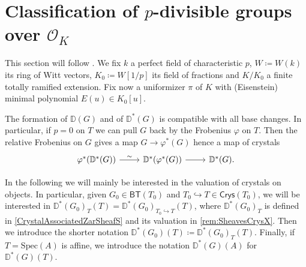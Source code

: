 \documentclass[../Main]{subfiles}
\begin{document}
\section{Classification of \texorpdfstring{$p$}{p}-divisible groups
	over \texorpdfstring{$\mathcal{O}_{ K }$}{the ring of integers of K}}
This section will follow \cite[Appendix A]{Kisin}.
We fix $k$ a perfect field of characteristic $p$,
$W \coloneqq W(k)$ its ring of Witt vectors, $K_0 \coloneqq W[1/p]$
its field of fractions and $K/K_0$ a finite totally ramified extension.
Fix now a uniformizer $\pi$ of $K$ with (Eisenstein) minimal polynomial
$E(u) \in K_0[u]$.


\begin{rem}[]
	The formation of $\mathbb{D}(G)$ and of $\mathbb{D}^*(G)$ is compatible
	with all base changes. %
	In particular, if $p = 0$ on $T$ we can pull $G$ back by the Frobenius $\varphi$ on $T$.
	Then the relative Frobenius on $G$ gives a map $G \to \varphi^*(G)$
	hence a map of crystals
	\begin{equation*}
	\begin{tikzcd}
		\varphi^* (\mathbb{D}^*(G)) \arrow[r, "\sim", rightarrow] &
		\mathbb{D}^*(\varphi^*(G)) \arrow[r, "", rightarrow] &
		\mathbb{D}^*(G)
	.\end{tikzcd}
	\end{equation*}
\end{rem}


\begin{ntt}[]
	In the following we will mainly be interested in the valuation of
	crystals on objects.
	In particular, given $G_0 \in \mathsf{BT}(T_0)$ and 
	$T_0 \hookrightarrow T \in \mathsf{Crys}(T_0)$, we will be interested
	in $\mathbb{D}^*(G_0)_{T}(T) = \mathbb{D}^*(G_0)_{T_0 \hookrightarrow T}(T)$,
	where $\mathbb{D}^*(G_0)_T$ is defined in \cref{CrystalAssociatedZarSheafS}
	and its valuation in \cref{rem:SheavesCrysX}.
	Then we introduce the shorter notation
	$\mathbb{D}^*(G_0)(T) \coloneqq \mathbb{D}^*(G_0)_T(T)$.
	Finally, if $T = \mathrm{Spec}(A)$ is affine, we introduce the notation
	$\mathbb{D}^*(G)(A)$ for $\mathbb{D}^*(G)(T)$.
\end{ntt}
\end{document}
